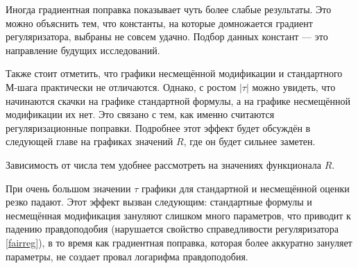 \documentclass[12pt]{article}
\begin{document}
Иногда градиентная поправка показывает чуть более слабые результаты. Это можно объяснить тем, что константы, на которые домножается градиент регуляризатора, выбраны не совсем удачно. Подбор данных констант --- это направление будущих исследований. 

Также стоит отметить, что  графики несмещённой модификации и стандартного М-шага практически не отличаются. Однако, с ростом $|\tau|$ можно увидеть, что начинаются скачки на графике стандартной формулы, а на графике несмещённой модификации их нет. Это связано с тем, как именно считаются регуляризационные поправки. Подробнее этот эффект будет обсуждён в следующей главе на графиках значений $R$, где он будет сильнее заметен.

Зависимость от числа тем  удобнее рассмотреть на значениях функционала $R$.

При очень большом значении $\tau$ графики для стандартной и несмещённой оценки резко падают. Этот эффект вызван следующим: стандартные формулы и несмещённая модификация зануляют слишком много параметров, что приводит к падению правдоподобия (нарушается свойство справедливости регуляризатора \ref{fairreg}), в то время как градиентная поправка, которая более аккуратно зануляет параметры, не создает провал логарифма правдоподобия.
\end{document}
